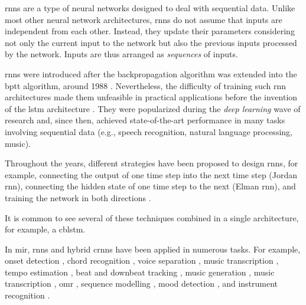 

\glspl{rnn} are a type of neural networks designed to deal
with sequential data. Unlike most other neural network
architectures, \glspl{rnn} do not assume that inputs are
independent from each other. Instead, they update their
parameters considering not only the current input to the
network but also the previous inputs processed by the
network. Inputs are thus arranged as \emph{sequences} of
inputs.

\glspl{rnn} were introduced after the backpropagation
algorithm \parencite{rumelhart1988learning} was extended
into the \gls{bptt} algorithm, around 1988
\parencite{werbos1988generalization,
werbos1990backpropagation}. Nevertheless, the difficulty of
training such \gls{rnn} architectures made them unfeasible
in practical applications before the invention of the
\gls{lstm} architecture \parencite{hochreiter1997long}. They
were popularized during the \emph{deep learning} wave of
research and, since then, achieved state-of-the-art
performance in many tasks involving sequential data (e.g.,
speech recognition, natural language processing, music).

Throughout the years, different strategies have been
proposed to design \glspl{rnn}, for example, connecting the
output of one time step into the next time step (Jordan
\gls{rnn}), connecting the hidden state of one time step to
the next (Elman \gls{rnn}), and training the network in both
directions \parencite{schuster1997bidirectional}.

It is common to see several of these techniques combined in
a single architecture, for example, a \gls{cblstm}.

In \gls{mir}, \glspl{rnn} and hybrid \glspl{crnn} have been
applied in numerous tasks. For example, onset detection
\parencite{eyben2010universal}, chord recognition
\parencite{boulangerlewandowski2013audio, sigtia2016endend,
sears2018evaluating}, voice separation
\parencite{huang2014singingvoice}, music transcription
\parencite{sigtia2014rnnbased}, tempo estimation
\parencite{bock2015accurate}, beat and downbeat tracking
\parencite{bock2016joint, krebs2016downbeat}, music
generation \parencite{liu2016predicting, liang2017automatic,
lim2017chord}, music transcription
\parencite{rigaud2016singing, sigtia2016endend,
southall2016automatic, vogl2016recurrent,
southall2017automatic, vogl2017drum, basaran2018main},
\gls{omr} \parencite{calvozaragoza2017onestep,
wel2017optical, calvozaragoza2018cameraprimus}, sequence
modelling \parencite{ycart2017study}, mood detection
\parencite{delbouys2018music}, and instrument recognition
\parencite{gururani2018instrument}.




